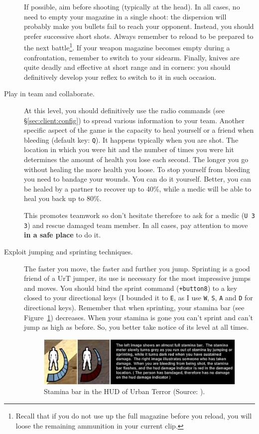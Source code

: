 \begin{description}
  If possible, aim before shooting (typically at the head). In all cases, no
  need to empty your magazine in a single shoot: the dispersion will probably make
  you bullets fail to reach your opponent.  
  Instead, you should prefer successive short shots.
  Always remember to reload to be prepared to the next battle\footnote{Recall
    that if you do not use up the full magazine before you reload, you will
    loose the remaining ammunition in your current clip.}.  
  If your weapon magazine becomes empty during a confrontation, remember to
  switch to your sidearm.  
  Finally, knives are quite deadly and effective at short range and in
  corners: you should definitively develop your reflex to switch to it in such
  occasion.     
\item[Play in team and collaborate.] At this level, you should definitively
  use the radio commands (see \S\ref{sec:client:config}) to spread various
  information to your team.  
  Another specific aspect of the game is the capacity to heal yourself or a
  friend when bleeding (default key: \texttt{Q}). 
  It happens typically when you are shot. The location in which you were hit and
  the number of times you were hit determines the amount of health you lose each
  second. 
  The longer you go without healing the more health you loose. 
  To stop yourself from bleeding you need to bandage your wounds. 
  You can do it yourself. Better, you can be healed by a partner to recover up
  to 40\%, while a medic will be able to heal you back up to 80\%. 

  This promotes teamwork so don't hesitate therefore to ask for a medic
  (\texttt{U 3 3}) and rescue damaged team member. 
  In all cases, pay attention to move \textbf{in a safe place} to do it.
\item[Exploit jumping and sprinting techniques.]
  The faster you move, the faster and further you jump. Sprinting is a good
  friend of a UrT jumper, its use is necessary for the most impressive jumps and
  moves. You should bind the sprint command (\texttt{+button8}) to a key closed
  to your directional keys (I bounded it to \texttt{E}, as I use \texttt{W},
  \texttt{S}, \texttt{A} and \texttt{D} for directional keys). 
  Remember that when sprinting, your stamina bar (see Figure~\ref{fig:stamina})
  decreases. 
  When your stamina is gone you can't sprint and can't jump as high as
  before. So, you better take notice of its level at all times.
 
  \begin{figure}[ht]
    \centering\includegraphics[scale=0.6]{Images/Hud_staminabar.jpg}
    \caption{\small Stamina bar in the HUD of Urban Terror (Source: \cite{urt}).}
    \label{fig:stamina}
  \end{figure}
  

\end{description}
